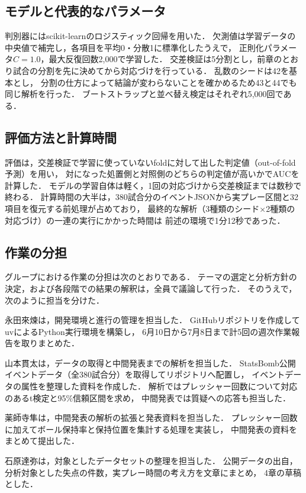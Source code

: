 \documentclass[11pt]{ujarticle} %
\begin{document}
\subsection{モデルと代表的なパラメータ}

判別器にはscikit-learnのロジスティック回帰を用いた．
欠測値は学習データの中央値で補完し，各項目を平均0・分散1に標準化したうえで，
正則化パラメータ$C=1.0$，最大反復回数2{,}000で学習した．
交差検証は5分割とし，前章のとおり試合の分割を先に決めてから対応づけを行っている．
乱数のシードは42を基本とし，
分割の仕方によって結論が変わらないことを確かめるため43と44でも同じ解析を行った．
ブートストラップと並べ替え検定はそれぞれ5{,}000回である．

\subsection{評価方法と計算時間}

評価は，交差検証で学習に使っていないfoldに対して出した判定値（out-of-fold予測）を用い，
対になった処置側と対照側のどちらの判定値が高いかでAUCを計算した．
モデルの学習自体は軽く，1回の対応づけから交差検証までは数秒で終わる．
計算時間の大半は，380試合分のイベントJSONから実プレー区間と32項目を復元する前処理が占めており，
最終的な解析（3種類のシード×2種類の対応づけ）の一連の実行にかかった時間は
前述の環境で1分12秒であった．

\subsection{作業の分担}

グループにおける作業の分担は次のとおりである．
テーマの選定と分析方針の決定，および各段階での結果の解釈は，全員で議論して行った．
そのうえで，次のように担当を分けた．

永田來煉は，開発環境と進行の管理を担当した．
GitHubリポジトリを作成してuvによるPython実行環境を構築し，
6月10日から7月8日まで計5回の週次作業報告を取りまとめた．

山本貫太は，データの取得と中間発表までの解析を担当した．
StatsBomb公開イベントデータ（全380試合分）を取得してリポジトリへ配置し，
イベントデータの属性を整理した資料を作成した．
解析ではプレッシャー回数について対応のあるt検定と95\%信頼区間を求め，
中間発表では質疑への応答も担当した．

薬師寺隼は，中間発表の解析の拡張と発表資料を担当した．
プレッシャー回数に加えてボール保持率と保持位置を集計する処理を実装し，
中間発表の資料をまとめて提出した．

石原達弥は，対象としたデータセットの整理を担当した．
公開データの出自，分析対象とした失点の件数，実プレー時間の考え方を文章にまとめ，
4章の草稿とした．
\end{document}
